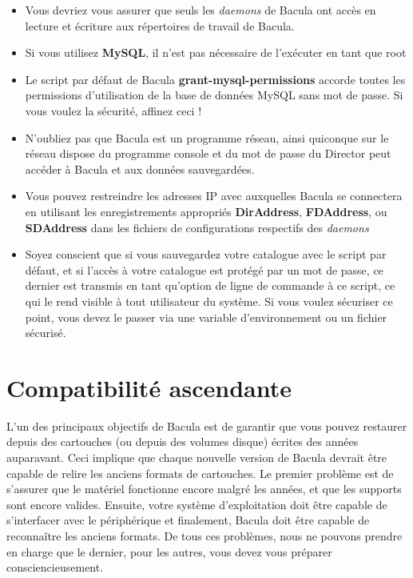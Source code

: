 \begin{itemize}
recommand\'e de faire des  sauvegardes \`a travers un r\'eseau non
s\'ecuris\'e (par exemple, Internet). Nous  pr\'evoyons d'int\'egrer le
chiffrage {\bf ssl} dans une version future.  
\item Vous devriez vous assurer que seuls les {\it daemons} de Bacula ont
   acc\`es  en lecture et \'ecriture aux r\'epertoires de travail de Bacula.  
\item Si vous utilisez {\bf MySQL}, il n'est pas n\'ecessaire de l'ex\'ecuter
   en tant que root  
\item Le script par d\'efaut de Bacula {\bf grant-mysql-permissions} accorde
   toutes les  permissions d'utilisation de la base de donn\'ees MySQL sans mot
   de passe. Si vous  voulez la s\'ecurit\'e, affinez ceci !  
\item N'oubliez pas que Bacula est un programme r\'eseau, ainsi quiconque sur
   le r\'eseau  dispose du programme console et du mot de passe du Director peut
   acc\'eder \`a  Bacula et aux donn\'ees sauvegard\'ees.  
\item Vous pouvez restreindre les adresses IP avec auxquelles Bacula se
   connectera en  utilisant les enregistrements appropri\'es {\bf DirAddress},
   {\bf FDAddress},  ou {\bf SDAddress} dans les fichiers de configurations
respectifs des {\it daemons}  
\item Soyez conscient que si vous sauvegardez votre catalogue avec le script 
   par d\'efaut, et si l'acc\`es \`a votre catalogue est prot\'eg\'e par un mot de passe, 
   ce dernier est transmis en tant qu'option de ligne de commande \`a ce script, 
   ce qui le rend visible \`a tout utilisateur du syst\`eme. Si vous voulez 
   s\'ecuriser ce point, vous devez le passer via une variable d'environnement 
   ou un fichier s\'ecuris\'e.
\end{itemize}

\section{Compatibilit\'e ascendante}
L'un des principaux objectifs de Bacula est de garantir que vous pouvez 
restaurer depuis des cartouches (ou depuis des volumes disque) \'ecrites des ann\'ees 
auparavant. Ceci implique que chaque nouvelle version de Bacula devrait \^etre 
capable de relire les anciens formats de cartouches. Le premier probl\`eme est de 
s'assurer que le mat\'eriel fonctionne encore malgr\'e les ann\'ees, et que les supports 
sont encore valides. Ensuite, votre syst\`eme d'exploitation doit \^etre capable 
de s'interfacer avec le p\'eriph\'erique et finalement, Bacula doit \^etre capable 
de reconna\^itre les anciens formats. De tous ces probl\`emes, nous ne pouvons 
prendre en charge que le dernier, pour les autres, vous devez vous pr\'eparer 
consciencieusement.

